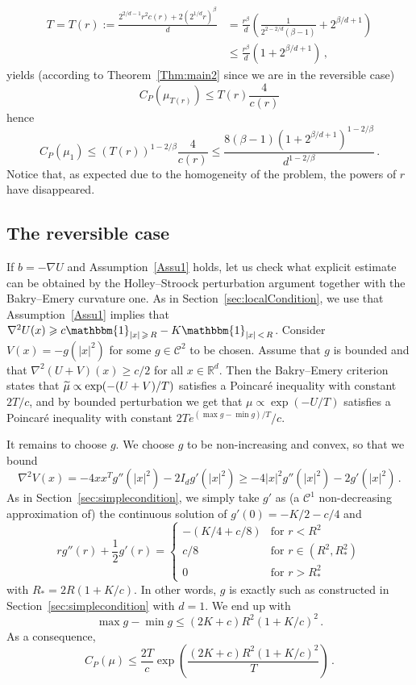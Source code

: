 \documentclass[AHL,Unicode,longabstracts,published]{cedram}
\newcommand{\R}{\mathbb R}
\newcommand{\clC}{\mathcal C}
\newcommand{\na}{\nabla}
\newcommand{\1}{\mathbbm{1}}
\newcommand{\nv}[1]{#1}
\let\oldtilde\tilde
\renewcommand*{\tilde}[1]{\mathchoice{\widetilde{#1}}{\widetilde{#1}}{\oldtilde{#1}}{\oldtilde{#1}}}
\newcommand{\R}{\mathbb R}
\begin{document}
\begin{align*}
T = T(r) := \frac{ 2^{2/d-1} r^2 c(r)+2(2^{1/d}r)^\beta}{d} &= \frac{ r^{\beta} }{ d} \left( \frac{1}{2^{2-2/d} (\beta-1)} + 2^{\beta/d+1}\right)\\
&\leqslant \frac{r^\beta}{d}\left( 1+ 2^{\beta/d+1} \right) \,,
\end{align*}
yields (according to Theorem~\ref{Thm:main2} since we are in the reversible case)
\[
C_P(\mu_{T(r)}) \leqslant T(r)\frac{4}{c(r)}
\]
hence
\[
C_P(\mu_1) \leqslant \left( T(r)\right)^{1-2/\beta}\frac{4}{c(r)} \leqslant \frac{ 8 (\beta-1) \left( 1+ 2^{\beta/d+1} \right)^{1-2/\beta}}{d^{1-2/\beta}}\,.
\]
Notice that, as expected due to the homogeneity of the problem, the powers of $r$ have disappeared.


\subsection{The reversible case}\label{Sec:reversible}

If $b=-\na U$ and Assumption~\ref{Assu1} holds, let us check what explicit estimate can be obtained by the Holley--Stroock perturbation argument together with the Bakry--Emery curvature one. As in Section~\ref{sec:localCondition}, we use that Assumption~\ref{Assu1} implies that $\na^2 U(x) \geqslant c\1_{|x|\,\geqslant\,R}-K\1_{|x|\,<\,R}$. Consider $V(x)= - g(|x|^2)$ for some $g\in\clC^2$ to be chosen. Assume that $g$ is bounded and that $\na^2 (U+V)(x) \geqslant c/2$ for all $x\in\R^d$. Then the Bakry--Emery criterion states that $\tilde \mu \propto \exp(-(U+V)/T)$ satisfies a Poincaré inequality with constant $2T/c$, and by bounded perturbation we get that $\mu\propto \exp(-U/T)$ satisfies a Poincaré inequality with constant $2T e^{(\max g - \min g)/T}/c$.

It remains to choose $g$. We \nv{choose} $g$ to be non-increasing and convex, so that we bound
\[
\na^2 V(x) = - 4 x x^T g''(|x|^2) - 2 I_d g'(|x|^2) \geqslant -4|x|^2 g''(|x|^2) - 2 g'(|x|^2) \,.
\]
As in Section~\ref{sec:simplecondition}, we simply take $g'$ as (a $\clC^1$ non-decreasing approximation of) the continuous solution of $g'(0)=-K/2-c/4$ and
\[
r g''(r) + \frac{1}2 g'(r) = \left\{
\begin{array}{ll}
-(K/4+c/8) & \text{for }r<R^2\\
c/8 & \text{for }r\in(R^2,R_*^2)\\
0 & \text{for }r>R_*^2
\end{array}\right.
\]
with $R_* =2R(1+K/c)$. In other words, $g$ is exactly such as constructed in Section~\ref{sec:simplecondition} with $d=1$. We end up with
\[
\max g - \min g \leqslant (2K+c)R^2(1+K/c)^2\,.
\]
As a consequence,
\[
C_P(\mu) \leqslant \frac{2T}{c}\exp\left( \frac{(2K+c)R^2(1+K/c)^2}{T}\right) \,.
\]
\end{document}
